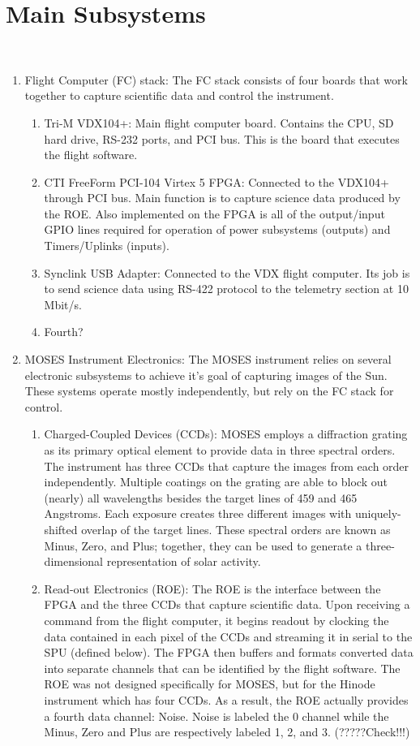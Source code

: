 %
\section{Main Subsystems}
\hrulefill
\\

	\begin{enumerate}
		\item Flight Computer (FC) stack: The FC stack consists of four boards that work together to capture scientific data and control the instrument.
		\begin{enumerate}
			\item Tri-M VDX104+: Main flight computer board. Contains the CPU, SD hard drive, RS-232 ports, and PCI bus. This is the board that executes the flight software.
			\item CTI FreeForm PCI-104 Virtex 5 FPGA: Connected to the VDX104+ through PCI bus. Main function is to capture science data produced by the ROE. Also implemented on the FPGA is all of the output/input GPIO lines required for operation of power subsystems (outputs) and Timers/Uplinks (inputs).
			\item Synclink USB Adapter: Connected to the VDX flight computer. Its job is to send science data using RS-422 protocol to the telemetry section at 10 Mbit/s.
			\item Fourth?
		\end{enumerate}
		\item MOSES Instrument Electronics: The MOSES instrument relies on several electronic subsystems to achieve it's goal of capturing images of the Sun. These systems operate mostly independently, but rely on the FC stack for control.
		\begin{enumerate}
			\item Charged-Coupled Devices (CCDs): MOSES employs a diffraction grating as its primary optical element to provide data in three spectral orders. The instrument has three CCDs that capture the images from each order independently. Multiple coatings on the grating are able to block out (nearly) all wavelengths besides the target lines of 459 and 465 Angstroms. Each exposure creates three different images with uniquely-shifted overlap of the target lines. These spectral orders are known as Minus, Zero, and Plus; together, they can be used to generate a three-dimensional representation of solar activity.
			\item Read-out Electronics (ROE):  The ROE is the interface between the FPGA and the three CCDs that capture scientific data. Upon receiving a command from the flight computer, it begins readout by clocking the data contained in each pixel of the CCDs and streaming it in serial to the SPU (defined below). The FPGA then buffers and formats converted data into separate channels that can be identified by the flight software. The ROE was not designed specifically for MOSES, but for the Hinode instrument which has four CCDs. As a result, the ROE actually provides a fourth data channel: Noise. Noise is labeled the 0 channel while the Minus, Zero and Plus are respectively labeled 1, 2, and 3. (?????Check!!!)

\end{enumerate}
\end{enumerate}
